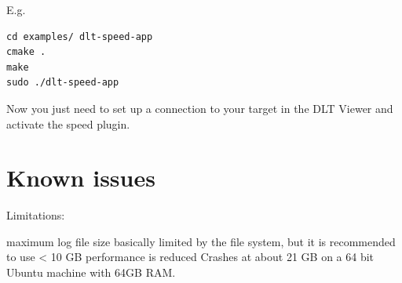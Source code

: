 \documentclass[a4paper,11pt]{article}
\begin{document}
E.g.
\begin{verbatim}
cd examples/ dlt-speed-app
cmake .
make
sudo ./dlt-speed-app
\end{verbatim}

Now you just need to set up a connection to your target in the DLT Viewer and activate the speed plugin.

\pagebreak
\section{Known issues}

Limitations:

maximum log file size basically limited by the file system, but it is recommended to use < 10 GB
performance is reduced
Crashes at about 21 GB on a 64 bit Ubuntu machine with 64GB RAM.

\end{document}

